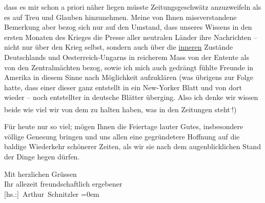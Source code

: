                dass es mir schon a priori näher liegen müsste  Zeitungsgeschwätz anzuzweifeln als es auf Treu und Glauben
               hinzunehmen. Meine von Ihnen missverstandene Bemerkung aber bezog sich nur auf den
               Umstand, dass unseres Wissens in den {\pb}ersten
               Monaten des Krieges die Presse aller neutralen Länder ihre Nachrichten – nicht nur
               über den Krieg selbst, sondern auch über die \uline{inneren}
               Zustände Deutschlands und Oesterreich-Ungarns in reicherem Mass von der Entente als von
               den Zentralmächten bezog, sowie ich mich auch gedrängt fühlte Freunde in Amerika in diesem Sinne nach Möglichkeit aufzuklären (was übrigens zur Folge
               hatte, dass einer dieser \label{K_L02224-4v}\label{K_L02224-4} ganz entstellt in ein New-Yorker Blatt und von dort
               wieder \introOben{}–\introOben{} noch entstellter in deutsche Blätter überging.
               Also ich denke wir wissen beide wie viel wir von dem zu halten haben, was in den
               Zeitungen steht\substVorne{}\textsuperscript{.}\substDazwischen{}!\substHinten{}\introOben{})\introOben{}\pend
           
\pstart
           Für heute nur so viel; mögen Ihnen die Feiertage lauter Gutes, insbesondere völlige
               Genesung bringen und uns allen eine gegründetere Hoffnung auf die baldige Wiederkehr
               schönerer Zeiten, als wir sie nach dem augenblicklichen Stand der Dinge hegen
               dürfen.\pend
           
\pstart
           Mit herzlichen Grüssen{\\[\baselineskip]}Ihr allezeit freundschaftlich ergebener{\\[\baselineskip]}\spacefill\mbox{{[}hs.:{]} Arthur Schnitzler}\pend
           \leftskip=0em{}\endnumbering{}  
      